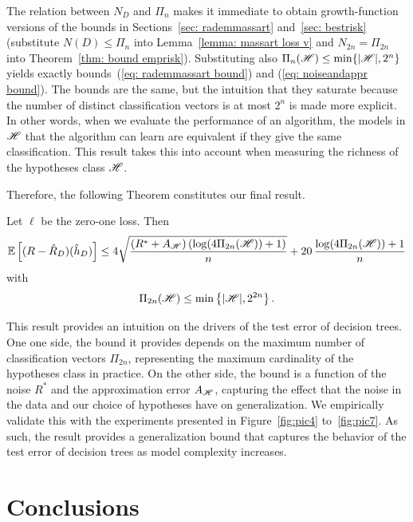 \documentclass[reqno]{amsart}
\let\oldsection\section
\renewcommand{\section}{\clearpage\thispagestyle{plain}\oldsection}
\begin{document}
The relation between $N_D$ and $\Pi_n$ makes it immediate to obtain growth-function versions of the bounds in Sections~\ref{sec: rademmassart} and~\ref{sec: bestrisk} (substitute $N(D)\le\Pi_n$ into Lemma~\ref{lemma: massart loss v} and $N_{2n} = \Pi_{2n}$ into Theorem~\ref{thm: bound emprisk}). Substituting also $\Pi_{n}(\mathscr{H})\le\min\{\vert \mathscr{H} \vert,2^n\}$ yields exactly bounds~(\ref{eq: rademmassart bound}) and (\ref{eq: noiseandappr bound}). The bounds are the same, but the intuition that they saturate because the number of distinct classification vectors is at most $2^n$ is made more explicit. In other words, when we evaluate the performance of an algorithm, the models in $\mathscr{H}$ that the algorithm can learn are equivalent if they give the same classification. This result takes this into account when measuring the richness of the hypotheses class $\mathscr{H}$. 

Therefore, the following Theorem constitutes our final result. 

\begin{theorem}\label{thm: FINALE}
    Let $\ell$ be the zero-one loss. Then
\[
\mathbb{E}\left[(R-\hat R_D)(\hat h_D)\right] \le 4\sqrt{\frac{(R^*+A_{\mathscr{H}})\left(\log (4\Pi_{2n}(\mathscr{H}))+1\right)}{n}} + 20\,\frac{\log(4\Pi_{2n}(\mathscr{H}))+1}{n}
\]
with
\[
\Pi_{2n}(\mathscr{H}) \le \min\left\{\vert\mathscr{H}\vert, 2^{2n}\right\}.
\]
\end{theorem}

This result provides an intuition on the drivers of the test error of decision trees. One one side, the bound it provides depends on the maximum number of classification vectors $\Pi_{2n}$, representing the maximum cardinality of the hypotheses class in practice. On the other side, the bound is a function of the noise $R^*$ and the approximation error $ A_{\mathscr{H}}$, capturing the effect that the noise in the data and our choice of hypotheses have on generalization. We empirically validate this with the experiments presented in Figure~\ref{fig:pic4} to~\ref{fig:pic7}. As such, the result provides a generalization bound that captures the behavior of the test error of decision trees as model complexity increases. 

\newpage
\section{Conclusions}\label{sec: concl}
\end{document}
